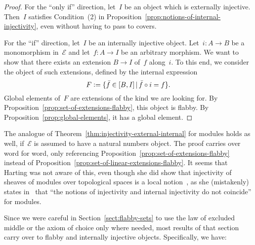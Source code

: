 \documentclass[oneside]{amsart}
\theoremstyle{definition}
\theoremstyle{plain}
\theoremstyle{remark}
\newcommand{\E}{\mathcal{E}}
\newcommand{\defeq}{\vcentcolon=}
\renewcommand{\_}{\mathpunct{.}\,}
\begin{document}
\begin{proof}For the ``only if'' direction, let~$I$ be an object
which is externally injective. Then~$I$ satisfies Condition~(2) in
Proposition~\ref{prop:notions-of-internal-injectivity}, even without having to
pass to covers.

For the ``if'' direction, let~$I$ be an internally
injective object. Let~$i : A \to B$ be a monomorphism in~$\E$ and let~$f :
A \to I$ be an arbitrary morphism. We want to show that there exists an
extension $B \to I$ of~$f$ along~$i$. To this end, we consider the object of
such extensions, defined by the internal expression
\[ F \defeq \{ \bar{f} \in [B,I] \,|\, \bar{f} \circ i = f \}. \]
Global elements of~$F$ are extensions of the kind we are looking for.
By Proposition~\ref{prop:set-of-extensions-flabby}, this object is flabby.
By Proposition~\ref{prop:global-elements}, it has a global element.
\end{proof}

The analogue of Theorem~\ref{thm:injectivity-external-internal} for modules
holds as well, if~$\E$ is assumed to have a natural numbers object. The proof
carries over word for word, only referencing
Proposition~\ref{prop:set-of-extensions-flabby} instead of
Proposition~\ref{prop:set-of-linear-extensions-flabby}.
It seems that Harting was not aware of this, even though she did show that
injectivity of sheaves of modules over topological spaces is a local
notion~\cite{XXX}, as she
(mistakenly) states in~\cite[page~233]{harting:remark} that ``the notions of
injectivity and internal injectivity do not coincide'' for modules.

Since we were careful in Section~\ref{sect:flabby-sets} to use the law of
excluded middle or the axiom of choice only where needed, most results of that
section carry over to flabby and internally injective objects. Specifically, we
have:
\end{document}

